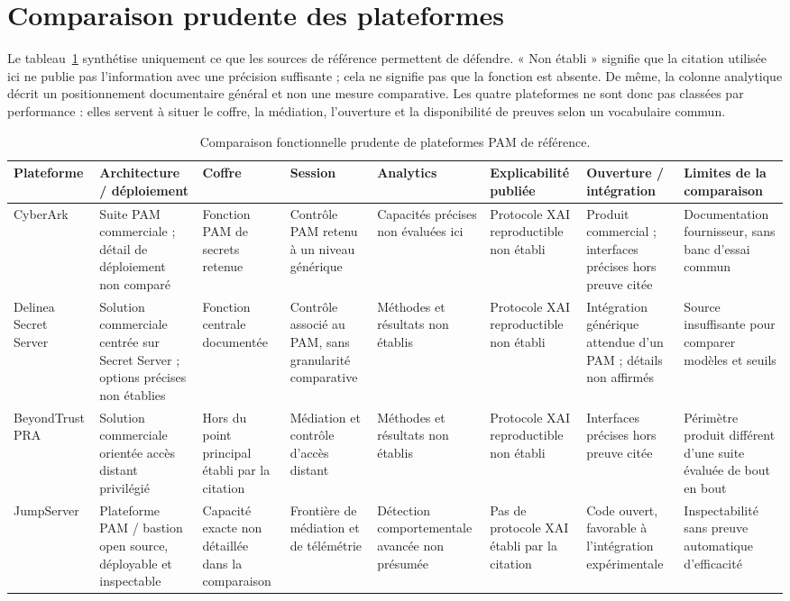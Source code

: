 \documentclass[11pt,a4paper,oneside]{report}
\theoremstyle{definition}
\theoremstyle{plain}
\begin{document}
\section{Comparaison prudente des plateformes}

Le tableau~\ref{tab:domain-pam-comparison} synthétise uniquement ce que les sources de référence permettent de défendre. « Non établi » signifie que la citation utilisée ici ne publie pas l'information avec une précision suffisante ; cela ne signifie pas que la fonction est absente. De même, la colonne analytique décrit un positionnement documentaire général et non une mesure comparative. Les quatre plateformes ne sont donc pas classées par performance : elles servent à situer le coffre, la médiation, l'ouverture et la disponibilité de preuves selon un vocabulaire commun.

\begin{table}[htbp]
\centering
\caption{Comparaison fonctionnelle prudente de plateformes PAM de référence.}
\label{tab:domain-pam-comparison}
\scriptsize
\begin{tabular}{@{}p{1.75cm}p{2.25cm}p{1.65cm}p{1.8cm}p{1.75cm}p{1.65cm}p{1.8cm}p{2.05cm}@{}}
\toprule
\textbf{Plateforme} & \textbf{Architecture / déploiement} & \textbf{Coffre} & \textbf{Session} & \textbf{Analytics} & \textbf{Explicabilité publiée} & \textbf{Ouverture / intégration} & \textbf{Limites de la comparaison} \\
\midrule
CyberArk~\cite{ref16}
& Suite PAM commerciale ; détail de déploiement non comparé & Fonction PAM de secrets retenue & Contrôle PAM retenu à un niveau générique & Capacités précises non évaluées ici & Protocole XAI reproductible non établi & Produit commercial ; interfaces précises hors preuve citée & Documentation fournisseur, sans banc d'essai commun \\
Delinea Secret Server~\cite{ref18}
& Solution commerciale centrée sur Secret Server ; options précises non établies & Fonction centrale documentée & Contrôle associé au PAM, sans granularité comparative & Méthodes et résultats non établis & Protocole XAI reproductible non établi & Intégration générique attendue d'un PAM ; détails non affirmés & Source insuffisante pour comparer modèles et seuils \\
BeyondTrust PRA~\cite{ref17}
& Solution commerciale orientée accès distant privilégié & Hors du point principal établi par la citation & Médiation et contrôle d'accès distant & Méthodes et résultats non établis & Protocole XAI reproductible non établi & Interfaces précises hors preuve citée & Périmètre produit différent d'une suite évaluée de bout en bout \\
JumpServer~\cite{ref5}
& Plateforme PAM / bastion open source, déployable et inspectable & Capacité exacte non détaillée dans la comparaison & Frontière de médiation et de télémétrie & Détection comportementale avancée non présumée & Pas de protocole XAI établi par la citation & Code ouvert, favorable à l'intégration expérimentale & Inspectabilité sans preuve automatique d'efficacité \\
\bottomrule
\end{tabular}
\end{table}
\end{document}
